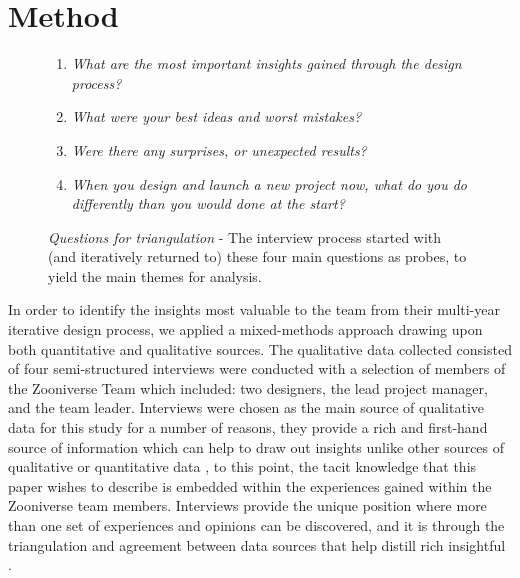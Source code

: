\documentclass{sigchi}
\begin{document}
\section{Method}

\begin{figure}[tbp]
\begin{center}
\begin{enumerate}[itemsep=2mm]
\item \emph{What are the most important insights gained through the design process?}
\item \emph{What were your best ideas and worst mistakes?}
\item \emph{Were there any surprises, or unexpected results?}
\item \emph{When you design and launch a new project now, what do you do differently than you would done at the start?}
\end{enumerate}
\vspace{10pt}
\label{tbl:questions}
\caption{\emph{Questions for triangulation} - The interview process started with (and iteratively returned to) these four main questions as probes, to yield the main themes for analysis.}
\end{center}
\vspace{-10pt}
\end{figure}

In order to identify the insights  most valuable to the team from their multi-year iterative design process, we applied a mixed-methods approach drawing upon both quantitative and qualitative sources. The qualitative data collected consisted of four semi-structured interviews were conducted with a selection of members of the Zooniverse Team which included: two designers, the lead project manager, and the team leader. Interviews were chosen as the main source of qualitative data for this study for a number of reasons, they provide a rich and first-hand source of information which can help to draw out insights unlike other sources of qualitative or quantitative data \cite{Yin2003}, to this point, the tacit knowledge that this paper wishes to describe is embedded within the experiences gained within the Zooniverse team members. Interviews provide the unique position where more than one set of experiences and opinions can be discovered, and it is through the triangulation and agreement between data sources that help distill rich insightful \cite{Denzin1978} \cite{Morse1994}. 
\end{document}
